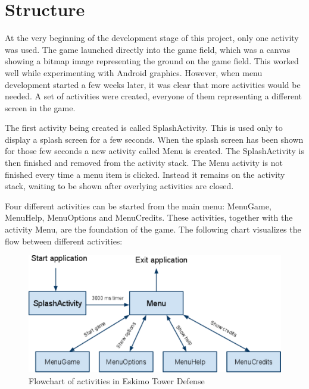\section{Structure}

At the very beginning of the development stage of this project, only one activity was used. The game launched directly into the game field, which was a canvas showing a bitmap image representing the ground on the game field. This worked well while experimenting with Android graphics. However, when menu development started a few weeks later, it was clear that more activities would be needed. A set of activities were created, everyone of them representing a different screen in the game.
 
The first activity being created is called SplashActivity. This is used only to display a splash screen for a few seconds. When the splash screen has been shown for those few seconds a new activity called Menu is created. The SplashActivity is then finished and removed from the activity stack. The Menu activity is not finished every time a menu item is clicked. Instead it remains on the activity stack, waiting to be shown after overlying activities are closed.

Four different activities can be started from the main menu: MenuGame, MenuHelp, MenuOptions and MenuCredits. These activities, together with the activity Menu, are the foundation of the game. The following chart visualizes the flow between different activities:

\begin{figure}[here]
\begin{center}
\includegraphics[scale=0.6]{pics/chapters/chapter4/codestructure}
\end{center}
\caption{Flowchart of activities in Eskimo Tower Defense}
\label{fig:codestructureActivities}
\end{figure}

